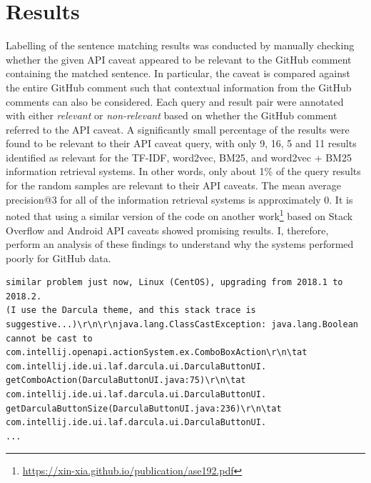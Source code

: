 \section{Results}
\label{sec:info-results}
Labelling of the sentence matching results was conducted by manually checking whether the given API caveat appeared to be relevant to the GitHub comment containing the matched sentence. In particular, the caveat is compared against the entire GitHub comment such that contextual information from the GitHub comments can also be considered. Each query and result pair were annotated with either \textit{relevant} or \textit{non-relevant} based on whether the GitHub comment referred to the API caveat. A significantly small percentage of the results were found to be relevant to their API caveat query, with only 9, 16, 5 and 11 results identified as relevant for the TF-IDF, word2vec, BM25, and word2vec + BM25 information retrieval systems. In other words, only about 1\% of the query results for the random samples are relevant to their API caveats. The mean average precision@3 for all of the information retrieval systems is approximately 0. It is noted that using a similar version of the code on another work\footnote{\url{https://xin-xia.github.io/publication/ase192.pdf}} based on Stack Overflow and Android API caveats showed promising results. I, therefore, perform an analysis of these findings to understand why the systems performed poorly for GitHub data.\\

\begin{lstlisting}[label=error-log,caption={Example of a GitHub comment containing an error log from \url{https://github.com/ChrisRM/material-theme-jetbrains/issues/863}},float,frame=tb,numbers=none,language=None]
similar problem just now, Linux (CentOS), upgrading from 2018.1 to 2018.2. 
(I use the Darcula theme, and this stack trace is suggestive...)\r\n\r\njava.lang.ClassCastException: java.lang.Boolean cannot be cast to com.intellij.openapi.actionSystem.ex.ComboBoxAction\r\n\tat com.intellij.ide.ui.laf.darcula.ui.DarculaButtonUI.
getComboAction(DarculaButtonUI.java:75)\r\n\tat com.intellij.ide.ui.laf.darcula.ui.DarculaButtonUI.
getDarculaButtonSize(DarculaButtonUI.java:236)\r\n\tat com.intellij.ide.ui.laf.darcula.ui.DarculaButtonUI.
...
\end{lstlisting}

